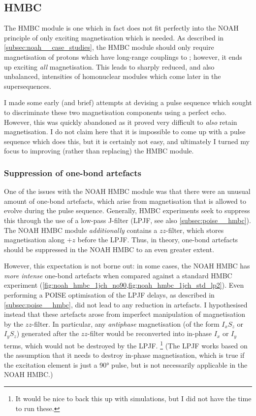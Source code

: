 \subsection{HMBC}
\label{subsec:noah__hmbc}

The HMBC module is one which in fact does not fit perfectly into the NOAH principle of only exciting magnetisation which is needed.
As described in \cref{subsec:noah__case_studies}, the HMBC module should only require magnetisation of protons which have long-range couplings to \carbon{}; however, it ends up exciting \textit{all}  magnetisation.
This leads to sharply reduced, and also unbalanced, intensities of homonuclear modules which come later in the supersequences.

I made some early (and brief) attempts at devising a pulse sequence which sought to discriminate these two magnetisation components using a perfect echo\autocite{Parella2019MRC}.
However, this was quickly abandoned as it proved very difficult to \textit{also} retain  magnetisation.
I do not claim here that it is impossible to come up with a pulse sequence which does this, but it is certainly not easy, and ultimately I turned my focus to improving (rather than replacing) the HMBC module.


\subsubsection{Suppression of one-bond artefacts}

One of the issues with the NOAH HMBC module was that there were an unusual amount of one-bond artefacts, which arise from  magnetisation that is allowed to evolve during the pulse sequence.
Generally, HMBC experiments seek to suppress this through the use of a low-pass J-filter (LPJF, see also \cref{subsec:poise__hmbc}).
The NOAH HMBC module \textit{additionally} contains a $zz$-filter, which stores  magnetisation along $+z$ before the LPJF.
Thus, in theory, one-bond artefacts should be suppressed in the NOAH HMBC to an even greater extent.

However, this expectation is not borne out: in some cases, the NOAH HMBC has \textit{more intense} one-bond artefacts when compared against a standard HMBC experiment (\cref{fig:noah_hmbc_1jch_no90,fig:noah_hmbc_1jch_std_lp2}).
Even performing a POISE optimisation of the LPJF delays, as described in \cref{subsec:poise__hmbc}, did not lead to any reduction in artefacts.
I hypothesised instead that these artefacts arose from imperfect manipulation of  magnetisation by the $zz$-filter.
In particular, any \textit{antiphase} magnetisation (of the form $I_xS_z$ or $I_yS_z$) generated after the $zz$-filter would be reconverted into in-phase $I_x$ or $I_y$ terms, which would not be destroyed by the LPJF.%
\footnote{It would be nice to back this up with simulations, but I did not have the time to run these.}
(The LPJF works based on the assumption that it needs to destroy in-phase magnetisation, which is true if the excitation element is just a \proton{} \ang{90} pulse, but is not necessarily applicable in the NOAH HMBC.)

